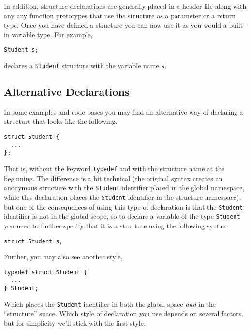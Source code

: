 In addition, structure declarations are generally placed in a header 
file along with any any function prototypes that use the structure as 
a parameter or a return type.  Once you have defined a structure you
can now use it as you would a built-in variable type.  For example, 

\texttt{Student s;}

declares a \texttt{Student} structure with the variable
name \texttt{s}.

\subsection{Alternative Declarations}

In some examples and code bases you may find an alternative way
of declaring a structure that looks like the following.

\begin{verbatim}
struct Student {
  ...
};
\end{verbatim}

That is, without the keyword \texttt{typedef} and with
the structure name at the beginning.  The difference is a bit 
technical (the original syntax creates an anonymous structure
with the \texttt{Student} identifier placed in the 
global namespace, while this declaration places the
\texttt{Student} identifier in the structure namespace), 
but one of the consequences of using this type of
declaration is that the \texttt{Student} identifier
is not in the global scope, so to declare a variable of the
type \texttt{Student} you need to further specify that
it is a structure using the following syntax.

\texttt{struct Student s;}

Further, you may also see another style, 

\begin{verbatim}
typedef struct Student {
  ...
} Student;
\end{verbatim}

Which places the \texttt{Student} identifier in both
the global space \emph{and} in the ``structure'' space.  
Which style of declaration you use depends on several factors, 
but for simplicity we'll stick with the first style.


